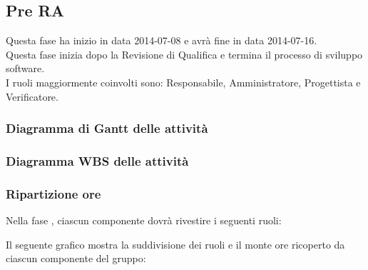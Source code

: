 \subsection{Pre RA}
Questa fase ha inizio in data 2014-07-08 e avrà fine in data 2014-07-16.\\
Questa fase inizia dopo la Revisione di Qualifica e termina il processo di sviluppo software.\\
I ruoli maggiormente coinvolti sono: Responsabile, Amministratore, Progettista e Verificatore.


\subsubsection{Diagramma di Gantt delle attività}

\newpage
\subsubsection{Diagramma WBS delle attività}

\newpage
\subsubsection{Ripartizione ore}

\newpage
Nella fase , ciascun componente dovrà rivestire i seguenti ruoli:

Il seguente grafico mostra la suddivisione dei ruoli e il monte ore ricoperto da ciascun componente del gruppo:
